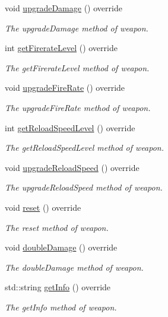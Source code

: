 \begin{DoxyCompactItemize}
void \hyperlink{class_knife_ad4a30cd292cabb9dd1d2638f893040b8}{upgrade\+Damage} () override
\begin{DoxyCompactList}\small\item\em The upgrade\+Damage method of weapon. \end{DoxyCompactList}\item 
int \hyperlink{class_knife_aaee97b167b530dafa85d8bead3403a10}{get\+Firerate\+Level} () override
\begin{DoxyCompactList}\small\item\em The get\+Firerate\+Level method of weapon. \end{DoxyCompactList}\item 
void \hyperlink{class_knife_a9c89877c20a19190103f8b5da013efb5}{upgrade\+Fire\+Rate} () override
\begin{DoxyCompactList}\small\item\em The upgrade\+Fire\+Rate method of weapon. \end{DoxyCompactList}\item 
int \hyperlink{class_knife_a42742989265d9ecf7eb6d96ec8ff0a5a}{get\+Reload\+Speed\+Level} () override
\begin{DoxyCompactList}\small\item\em The get\+Reload\+Speed\+Level method of weapon. \end{DoxyCompactList}\item 
void \hyperlink{class_knife_a270749a27205b0a0994d9dc6d4c93c9c}{upgrade\+Reload\+Speed} () override
\begin{DoxyCompactList}\small\item\em The upgrade\+Reload\+Speed method of weapon. \end{DoxyCompactList}\item 
void \hyperlink{class_knife_ad33b6b16ba209474ef0211317fce057b}{reset} () override
\begin{DoxyCompactList}\small\item\em The reset method of weapon. \end{DoxyCompactList}\item 
void \hyperlink{class_knife_aa32f6d087a7451a319c640652006a528}{double\+Damage} () override
\begin{DoxyCompactList}\small\item\em The double\+Damage method of weapon. \end{DoxyCompactList}\item 
std\+::string \hyperlink{class_knife_aa0d13d7ea1113f3dbd177c65acec9e87}{get\+Info} () override
\begin{DoxyCompactList}\small\item\em The get\+Info method of weapon. \end{DoxyCompactList}\end{DoxyCompactItemize}
